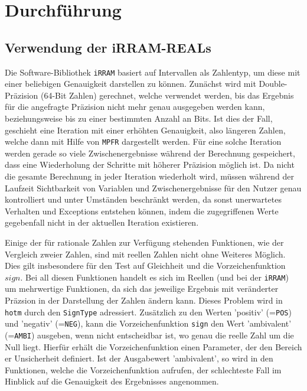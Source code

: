 \chapter{Durchführung}

\section{Verwendung der iRRAM-REALs}
Die Software-Bibliothek \verb+iRRAM+ \cite{Mller2009EnhancingIE} basiert auf Intervallen als Zahlentyp, um diese mit einer beliebigen Genauigkeit darstellen zu können. Zunächst wird mit Double-Präzision (64-Bit Zahlen) gerechnet, welche verwendet werden, bis das Ergebnis für die angefragte Präzision nicht mehr genau ausgegeben werden kann, beziehungsweise bis zu einer bestimmten Anzahl an Bits. Ist dies der Fall, geschieht eine Iteration mit einer erhöhten Genauigkeit, also längeren Zahlen, welche dann mit Hilfe von \verb+MPFR+ dargestellt werden.
Für eine solche Iteration werden gerade so viele Zwischenergebnisse während der Berechnung gespeichert, dass eine Wiederholung der Schritte mit höherer Präzision möglich ist. Da nicht die gesamte Berechnung in jeder Iteration wiederholt wird, müssen während der Laufzeit Sichtbarkeit von Variablen und Zwischenergebnisse für den Nutzer genau kontrolliert und unter Umständen beschränkt werden, da sonst unerwartetes Verhalten und Exceptions entstehen können, indem die zugegriffenen Werte gegebenfall nicht in der aktuellen Iteration existieren.


Einige der für rationale Zahlen zur Verfügung stehenden Funktionen, wie der Vergleich zweier Zahlen, sind mit reellen Zahlen nicht ohne Weiteres Möglich. Dies gilt insbesondere für den Test auf Gleichheit und die Vorzeichenfunktion $sign$. Bei all diesen Funktionen handelt es sich im Reellen (und bei der \verb+iRRAM+) um mehrwertige Funktionen, da sich das jeweilige Ergebnis mit veränderter Präzsion in der Darstellung der Zahlen ändern kann. Dieses Problem wird in \verb+hotm+ durch den \verb+SignType+ adressiert. Zusätzlich zu den Werten 'positiv' (=\verb+POS+) und 'negativ' (=\verb+NEG+),  kann die Vorzeichenfunktion \verb+sign+ den Wert 'ambivalent' (=\verb+AMBI+) ausgeben, wenn nicht entscheidbar ist, wo genau die reelle Zahl um die Null liegt. Hierfür erhält die Vorzeichenfunktion einen Parameter, der den Bereich er Unsicherheit definiert. Ist der Ausgabewert 'ambivalent', so wird in den Funktionen, welche die Vorzeichenfunktion aufrufen, der schlechteste Fall im Hinblick auf die Genauigkeit des Ergebnisses angenommen. 


